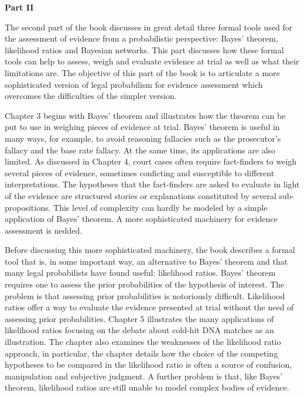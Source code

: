 \documentclass[10pt,dvipsnames,enabledeprecatedfontcommands]{scrartcl}
\begin{document}
\vspace{3mm}

\noindent \textbf{Part II}

\noindent The second part of the book discusses in great detail three
formal tools used for the assessment of evidence from a probabilistic
perspective: Bayes' theorem, likelihood ratios and Bayesian networks.
This part discusses how these formal tools can help to assess, weigh and
evaluate evidence at trial as well as what their limitations are. The
objective of this part of the book is to articulate a more sophisticated
version of legal probabilism for evidence assessment which overcomes the
difficulties of the simpler version.

Chapter 3 begins with Bayes' theorem and illustrates how the theorem can
be put to use in weighing pieces of evidence at trial. Bayes' theorem is
useful in many ways, for example, to avoid reasoning fallacies such as
the prosecutor's fallacy and the base rate fallacy. At the same time,
its applications are also limited. As discussed in Chapter 4, court
cases often require fact-finders to weigh several pieces of evidence,
sometimes conficting and susceptible to different interpretations. The
hypotheses that the fact-finders are asked to evaluate in light of the
evidence are structured stories or explanations constituted by several
sub-propositions. This level of complexity can hardly be modeled by a
simple application of Bayes' theorem. A more sophisticated machinery for
evidence assessment is nedded.

Before discussing this more sophisticated machinery, the book describes
a formal tool that is, in some important way, an alternative to Bayes'
theorem and that many legal probabilists have found useful: likelihood
ratios. Bayes' theorem requires one to assess the prior probabilities of
the hypothesis of interest. The problem is that assessing prior
probabilities is notoriously difficult. Likelihood ratios offer a way to
evaluate the evidence presented at trial without the need of assessing
prior probabilities. Chapter 5 illustrates the many applications of
likelihood ratios focusing on the debate about cold-hit DNA matches as
an illustration. The chapter also examines the weaknesses of the
likelihood ratio approach, in particular, the chapter details how the
choice of the competing hypotheses to be compared in the likelihood
ratio is often a source of confusion, manipulation and subjective
judgment. A further problem is that, like Bayes' theorem, likelihood
ratios are still unable to model complex bodies of evidence.
\end{document}

